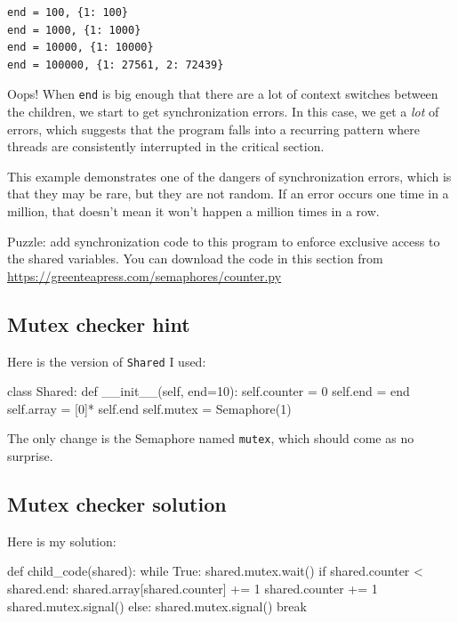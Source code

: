 \documentclass{book}
\begin{document}
\begin{verbatim}
end = 100, {1: 100}
end = 1000, {1: 1000}
end = 10000, {1: 10000}
end = 100000, {1: 27561, 2: 72439}
\end{verbatim}
%
Oops!  When {\tt end} is big enough that there are a lot of
context switches between the children, we start to get synchronization
errors.  In this case, we get a {\em lot} of errors, which suggests
that the program falls into a recurring pattern where threads are
consistently interrupted in the critical section.

This example demonstrates one of the dangers of synchronization
errors, which is that they may be rare, but they are not random.
If an error occurs one time in a million, that doesn't mean it
won't happen a million times in a row.

Puzzle: add synchronization code to this program to enforce
exclusive access to the shared variables.  You can download the
code in this section from \url{https://greenteapress.com/semaphores/counter.py}



\subsection {Mutex checker hint}

Here is the version of {\tt Shared} I used:

\begin{unbreakable}[title={}]{}
class Shared:
    def __init__(self, end=10):
        self.counter = 0
        self.end = end
        self.array = [0]* self.end
        self.mutex = Semaphore(1)
\end{unbreakable}

The only change is the Semaphore named {\tt mutex}, which should
come as no surprise.


\subsection {Mutex checker solution}

Here is my solution:

\begin{unbreakable}[title={}]{}
def child_code(shared):
  while True:
    shared.mutex.wait()
    if shared.counter < shared.end:
      shared.array[shared.counter] += 1
      shared.counter += 1
      shared.mutex.signal()
    else:
      shared.mutex.signal()
      break
\end{unbreakable}
\end{document}
